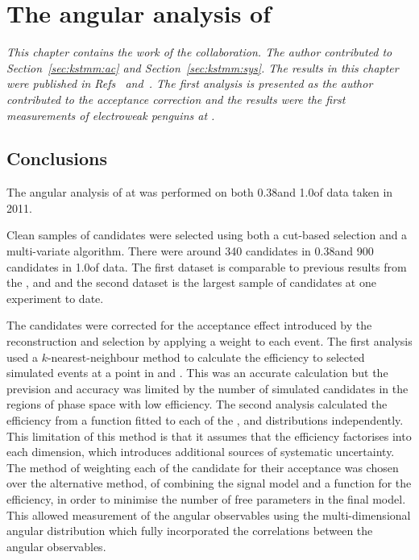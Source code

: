\chapter{The angular analysis of \BdToKstmm}
\label{chap:kstmm}

\emph{This chapter contains the work of the \lhcb collaboration. The author contributed to Section~\ref{sec:kstmm:ac}
and Section~\ref{sec:kstmm:sys}. The results in this chapter were published in Refs~\cite{LHCb-PAPER-2011-020} 
and~\cite{Aaij:2013iag}. The first analysis is presented as the author contributed to the acceptance correction 
and the results were the first measurements of electroweak penguins at \lhcb. }
















%


\section{Conclusions}

The angular analysis of \BdToKstmm  at \lhcb was performed on 
both 0.38\invfb and 1.0\invfb of data taken in 2011. 

Clean samples of \BdToKstmm candidates were selected using both a cut-based selection and a multi-variate algorithm. 
There were around 340 candidates in 0.38\invfb and 900 candidates in 1.0\invfb of data.
The first dataset is comparable to previous results from the \babar, \belle and \cdf 
and the second dataset is the largest sample of \BdToKstmm candidates at one experiment to date.

The candidates were corrected for the acceptance effect introduced by the reconstruction and selection by applying a weight to each event.
The first analysis used a $k$-nearest-neighbour method to calculate the efficiency to selected simulated events at a point in \ctl and \ctk.
This was an accurate calculation but the prevision and accuracy was limited by the number of simulated candidates in the regions of phase space with low efficiency.
The second analysis calculated the efficiency from a function fitted to each of the \ctl, \ctk and \varphi distributions independently.
This limitation of this method is that it assumes that the efficiency factorises into each dimension, which introduces additional sources of systematic uncertainty.
The method of weighting each of the \BdToKstmm candidate for their acceptance was chosen over the alternative method,
 of combining the signal model and a function for the efficiency, in order to minimise the number of free parameters in the final model. 	
This allowed measurement of the angular observables using the multi-dimensional angular distribution which fully incorporated the correlations between the angular observables.

